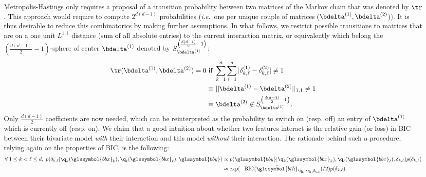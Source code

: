 Metropolis-Hastings only requires a proposal of a transition probability between two matrices of the Markov chain that was denoted by $\tr$. This approach would require to compute $2^{d(d-1)}$ probabilities (\textit{i.e.}\ one per unique couple of matrices ($\bdelta^{(1)},\bdelta^{(2)}$)). It is thus desirable to reduce this combinatorics by making further assumptions. In what follows, we restrict possible transitions to matrices that are on a one unit $L^{1,1}$ distance (sum of all absolute entries) to the current interaction matrix, or equivalently which belong the $\left( \frac{d(d-1)}{2}-1 \right)$-sphere of center $\bdelta^{(1)}$ denoted by $S^{\left( \frac{d(d-1)}{2}-1 \right)}_{\bdelta^{(1)}}$: 
\begin{align*}
\tr(\bdelta^{(1)},\bdelta^{(2)}) = 0 & \text{ if } \sum_{k=1}^d \sum_{\ell=1}^d |\delta^{(1)}_{k,\ell} - \delta^{(2)}_{k,\ell}| \neq 1 \\
 & \equiv ||\bdelta^{(1)} - \bdelta^{(2)}||_{1,1} \neq 1 \\
 & \equiv \bdelta^{(2)} \not\in S^{\left( \frac{d(d-1)}{2}-1 \right)}_{\bdelta^{(1)}}.
\end{align*}
Only $\frac{d(d-1)}{2}$ coefficients are now needed, which can be reinterpreted as the probability to switch on (resp. off) an entry of $\bdelta^{(1)}$ which is currently off (resp. on). We claim that a good intuition about whether two features interact is the relative gain (or loss) in BIC between their bivariate model \textit{with} their interaction and this model \textit{without} their interaction. The rationale behind such a procedure, relying again on the properties of BIC, is the following: 
\begin{align*}
\forall \: 1 \leq k < \ell \leq d, \; p(\delta_{k,\ell} | \q_k(\glssymbol{bbx}_k), \q_\ell(\glssymbol{bbx}_\ell), \glssymbol{bby}) & \propto p(\glssymbol{bby} | \q_k(\glssymbol{bbx}_k), \q_\ell(\glssymbol{bbx}_\ell), \delta_{k,\ell}) p(\delta_{k,\ell}) \\
& \approx \exp(-\text{BIC}(\hat{\glssymbol{bth}}_{\q_k,\q_\ell,\delta_{k,\ell}})/2) p(\delta_{k,\ell}).
\end{align*}

